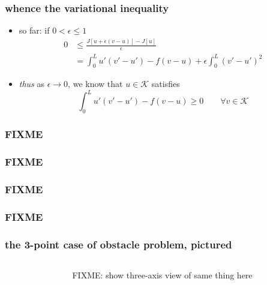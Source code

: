 \documentclass{beamer}
\newcommand{\eps}{\epsilon}
\begin{document}
\begin{frame}
  \frametitle{whence the variational inequality}

\begin{itemize}
\item so far: if $0<\eps\le 1$
\begin{align*}
0 &\le \frac{J[u + \eps(v-u)] - J[u]}{\eps} \\
  &= \int_0^L u' (v'-u') - f (v-u) + \eps \int_0^L (v'-u')^2
\end{align*}
\item \emph{thus} as $\eps \to 0$, we know that $u\in\mathcal{K}$ satisfies
  $$\int_0^L u' (v'-u') - f (v-u) \ge 0 \qquad \forall v\in\mathcal{K}$$
\end{itemize}
\end{frame}


\begin{frame}
  \frametitle{FIXME}

\end{frame}


\begin{frame}
  \frametitle{FIXME}

\end{frame}


\begin{frame}
  \frametitle{FIXME}

\end{frame}


\begin{frame}
  \frametitle{FIXME}

\end{frame}


\begin{frame}
  \frametitle{the 3-point case of obstacle problem, pictured}

\begin{columns}
\begin{column}{0.5\textwidth}
\begin{center}
\end{center}
\end{column}
\begin{column}{0.5\textwidth}
\begin{center}
FIXME: show three-axis view of same thing here
\end{center}
\end{column}
\end{columns}
\end{frame}
\end{document}
